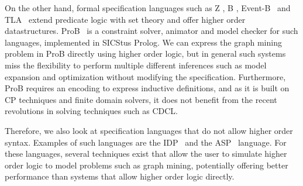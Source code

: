 On the other hand, formal specification languages such as Z \citep{Bowen:Z}, B \citep{Abrial:BBook}, Event-B~\citep{Abrial10} and TLA~\citep{books/aw/Lamport2002}
 extend predicate logic with set theory and offer higher order datastructures. ProB~\citep{journals/sttt/LeuschelB08} is a constraint solver, animator and model checker for such languages, implemented in SICStus Prolog.
We can express the graph mining problem in ProB directly using higher order logic, 
but in general such systems miss the flexibility to perform multiple different inferences such as model expansion and optimization without modifying the specification.
Furthermore, ProB requires an encoding to express inductive definitions,
and as it is built on CP techniques and finite domain solvers, it does not benefit from the recent revolutions in solving techniques such as CDCL.

Therefore, we also look at specification languages that do not allow higher order syntax.
Examples of such languages are the IDP~\citep{WarrenBook/DeCatBBD16} and the ASP~\citep{conf/rweb/EiterIK09} language.
For these languages, several techniques exist that allow the user to simulate higher order logic to model problems such as graph mining, potentially offering better performance than systems that allow higher order logic directly.


